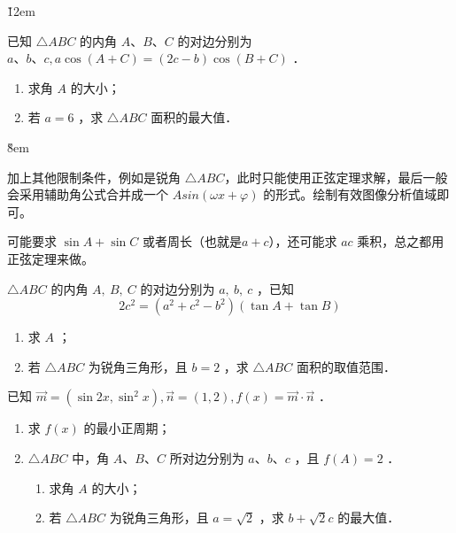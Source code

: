 \v{12em}

\begin{example}
    已知 $\triangle A B C$ 的内角 $A 、 B 、 C$ 的对边分别为 $a 、 b 、 c, a \cos (A+C)=(2 c-b) \cos (B+C)$ ．
    \begin{enumerate}
        \item 求角 $A$ 的大小；
        \item 若 $a=6$ ，求 $\triangle A B C$ 面积的最大值．
    \end{enumerate}
\end{example}

\v{8em}

\begin{theorem}[有限制的对边对角模型]
    加上其他限制条件，例如是锐角 $\triangle ABC$，此时只能使用正弦定理求解，最后一般会采用辅助角公式合并成一个 $Asin(\omega x + \varphi)$ 的形式。绘制有效图像分析值域即可。

    可能要求 $\sin A + \sin C$ 或者周长（也就是$a + c$），还可能求 $ac$ 乘积，总之都用正弦定理来做。
\end{theorem}

\begin{example}
    $\triangle A B C$ 的内角 $A, ~ B, ~ C$ 的对边分别为 $a, ~ b, ~ c$ ，已知
    $$
        2 c^2=\left(a^2+c^2-b^2\right)(\tan A+\tan B)
    $$
    \begin{enumerate}
        \item 求 $A$ ；
        \item 若 $\triangle A B C$ 为锐角三角形，且 $b=2$ ，求 $\triangle A B C$ 面积的取值范围．
    \end{enumerate}
\end{example}

\vspace{12em}

\begin{example}
    已知 $\overrightarrow{m}=\left(\sin 2 x, \sin ^2 x\right), \overrightarrow{n}=(1,2), f(x)=\overrightarrow{m} \cdot \overrightarrow{n}$ ．
    \begin{enumerate}
        \item 求 $f(x)$ 的最小正周期；
        \item $\triangle A B C$ 中，角 $A$、$B$、$C$ 所对边分别为 $a$、$b$、$c$ ，且 $f(A)=2$ ．
              \begin{enumerate}
                  \item 求角 $A$ 的大小；
                  \item 若 $\triangle A B C$ 为锐角三角形，且 $a=\sqrt{2}$ ，求 $b+\sqrt{2} c$ 的最大值．
              \end{enumerate}
    \end{enumerate}
\end{example}

